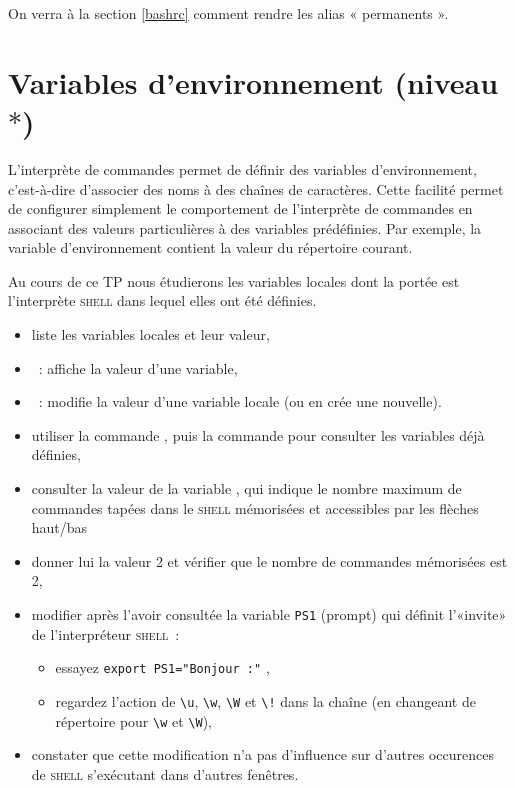 \documentclass[a4paper,11pt]{article}
\newcommand{\shell}{\textsc{shell}}
\begin{document}
On verra à la section \ref{bashrc} comment rendre les alias « permanents ». 


\section{Variables d'environnement %
(niveau $*$)}
\label{bash}
L'interprète de commandes permet de définir des variables d'environnement,
c'est-à-dire d'associer des noms à des chaînes de caractères. Cette facilité
permet de configurer simplement le comportement de l'interprète de commandes
en associant des valeurs particulières à des variables prédéfinies. Par
exemple, la variable d'environnement  contient la valeur du
répertoire courant.

Au cours de ce TP nous étudierons les variables locales dont la portée
est l'interprète \shell{} dans lequel elles ont été définies.

\begin{itemize}
  \item {} liste les variables locales et leur valeur,
  \item {} : affiche la valeur d'une  variable,
  \item {} :  modifie la valeur d'une variable
        locale (ou en crée une  nouvelle). 
\end{itemize}

\begin{maw}

\begin{itemize}
  \item utiliser la commande , puis la commande  pour
        consulter les variables déjà définies,
  \item consulter la valeur de la variable , qui indique le
        nombre maximum de commandes tapées dans le \shell{} mémorisées et
        accessibles par les flèches haut/bas 
  \item donner lui  la valeur 2 et vérifier que le nombre de commandes
        mémorisées est 2,
  \item modifier après l'avoir consultée la variable \texttt{PS1} (prompt) qui
        définit l'«invite» de l'interpréteur \shell{} :
        \begin{itemize}
          \item essayez \texttt{export PS1="Bonjour :"} ,
          \item regardez l'action de \verb+\u+, \verb+\w+, \verb+\W+ et
                \verb+\!+ dans la chaîne (en changeant de répertoire pour
                \verb+\w+ et \verb+\W+),
        \end{itemize}
  \item constater que cette modification n'a pas d'influence sur d'autres
        occurences de \shell{} s'exécutant dans d'autres fenêtres.
\end{itemize}

\end{maw}
\end{document}

